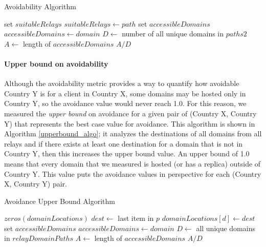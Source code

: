 \begin{algorithm}[t]
\caption{Avoidability Algorithm}
\label{avoid_algo}
\footnotesize
\begin{algorithmic}[1]
    \State set $suitableRelays$
		\State $suitableRelays \gets path$
	\EndIf
    \EndFor
    \State set $accessibleDomains$
        \State $accessibleDomains \gets domain$
        \EndIf
    \EndIf
    \EndFor
    \State $D \gets$ number of all unique domains in $paths2$
    \State $A \gets$ length of $accessibleDomains$
    \State \Return $A / D$
\EndFunction
\end{algorithmic}
\end{algorithm}


\paragraph{Upper bound on avoidability}  Although the avoidability metric
provides a way to quantify how avoidable Country Y is for a client in Country
X, some domains may be hosted only in Country Y, so the avoidance value  would
never reach 1.0.  For this reason, we measured the {\em upper bound} on
avoidance for a given pair of (Country X, Country Y) that represents the best
case value for avoidance.  This algorithm is shown in Algorithm \ref{upperbound_algo}; it analyzes the destinations of all
domains from all relays and if there exists at least one destination for a
domain that is not in Country Y, then this increases the upper bound value. An
upper bound of 1.0 means that every domain that we measured is hosted (or has
a replica) outside of Country Y.  This value puts the avoidance values in
perspective for each (Country X, Country Y) pair.

\begin{algorithm}[t]
\caption{Avoidance Upper Bound Algorithm}
\label{upperbound_algo}
\small
\begin{algorithmic}[1]
    \State $zeros(domainLocations)$
		\State $dest \gets $ last item in $p$
		\State $domainLocations[d] \gets dest$
    \EndFor
    \State set $accessibleDomains$
    \State $accessibleDomains \gets domain$
    \EndIf
    \EndFor
    \State $D \gets$ all unique domains in  $relayDomainPaths$
    \State $A \gets$ length of $accessibleDomains$
    \State \Return $A / D$
\EndFunction
\end{algorithmic}
\end{algorithm}

